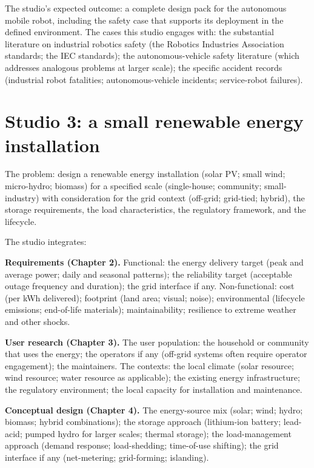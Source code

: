 The studio's expected outcome: a complete design pack for the autonomous mobile robot, including the safety case that supports its deployment in the defined environment. The cases this studio engages with: the substantial literature on industrial robotics safety (the Robotics Industries Association standards; the IEC standards); the autonomous-vehicle safety literature (which addresses analogous problems at larger scale); the specific accident records (industrial robot fatalities; autonomous-vehicle incidents; service-robot failures).

\section{Studio 3: a small renewable energy installation}

The problem: design a renewable energy installation (solar PV; small wind; micro-hydro; biomass) for a specified scale (single-house; community; small-industry) with consideration for the grid context (off-grid; grid-tied; hybrid), the storage requirements, the load characteristics, the regulatory framework, and the lifecycle.

The studio integrates:

\textbf{Requirements (Chapter 2).} Functional: the energy delivery target (peak and average power; daily and seasonal patterns); the reliability target (acceptable outage frequency and duration); the grid interface if any. Non-functional: cost (per kWh delivered); footprint (land area; visual; noise); environmental (lifecycle emissions; end-of-life materials); maintainability; resilience to extreme weather and other shocks.

\textbf{User research (Chapter 3).} The user population: the household or community that uses the energy; the operators if any (off-grid systems often require operator engagement); the maintainers. The contexts: the local climate (solar resource; wind resource; water resource as applicable); the existing energy infrastructure; the regulatory environment; the local capacity for installation and maintenance.

\textbf{Conceptual design (Chapter 4).} The energy-source mix (solar; wind; hydro; biomass; hybrid combinations); the storage approach (lithium-ion battery; lead-acid; pumped hydro for larger scales; thermal storage); the load-management approach (demand response; load-shedding; time-of-use shifting); the grid interface if any (net-metering; grid-forming; islanding).

